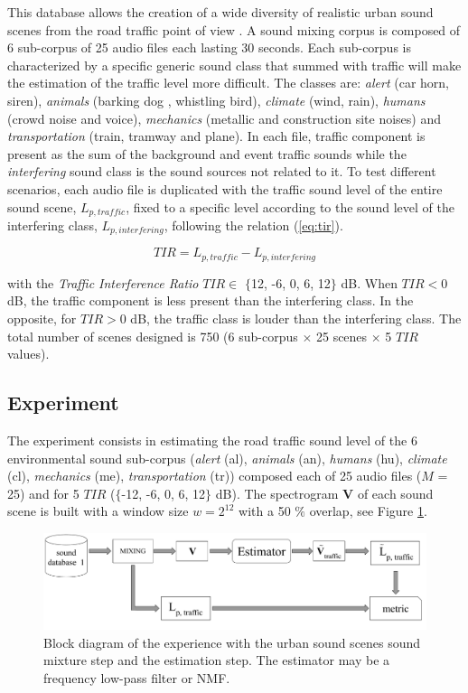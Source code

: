 \documentclass[twocolumn]{svjour3}          %
\begin{document}
This database allows the creation of a wide diversity of realistic urban sound scenes from the road traffic point of view \cite{gloaguen_creation_2017}. A sound mixing corpus is composed of 6 sub-corpus of 25 audio files each lasting 30 seconds. Each sub-corpus is characterized by a specific generic sound class that summed with traffic will make the estimation of the traffic level more difficult. The classes are: \textit{alert} (car horn, siren), \textit{animals} (barking dog , whistling bird), \textit{climate} (wind, rain), \textit{humans} (crowd noise and voice), \textit{mechanics} (metallic and construction site noises) and \textit{transportation} (train, tramway and plane). In each file, traffic component is present as the sum of the background and event traffic sounds while the \textit{interfering} sound class is the sound sources not related to it. To test different scenarios, each audio file is duplicated with the traffic sound level of the entire sound scene, $L_{p,traffic}$, fixed to a specific level according to the sound level of the interfering class, $L_{p,interfering}$,  following the relation (\ref{eq:tir}).

\begin{equation}\label{eq:tir}
TIR = L_{p,traffic}-L_{p,interfering}
\end{equation}

with the \textit{Traffic Interference Ratio} $TIR \in$ $\lbrace$12, -6, 0, 6, 12$\rbrace$ dB. When $TIR < 0$ dB, the traffic component is less present than the interfering class. In the opposite, for $TIR > 0$ dB, the traffic class is louder than the interfering class. The total number of scenes designed is 750 (6 sub-corpus $\times$ 25 scenes $\times$  5 $TIR$ values).

\subsection{Experiment}

The experiment consists in estimating the road traffic sound level of the 6 environmental sound sub-corpus (\textit{alert} (al), \textit{animals} (an), \textit{humans} (hu), \textit{climate} (cl), \textit{mechanics} (me), \textit{transportation} (tr)) composed each of 25 audio files ($M$ = 25) and for 5 $TIR$ ($\lbrace$-12, -6, 0, 6, 12$\rbrace$ dB). The spectrogram $\mathbf{V}$ of each sound scene is built with a window size $w = 2^{12}$ with a 50 $\%$ overlap, see Figure \ref{fig:bloc_experiment}.

\begin{figure}
    \centering
    \includegraphics[width=\linewidth]{figures/bloc_diagram_estimator.pdf}
    \caption{Block diagram of the experience with the urban sound scenes sound mixture step and the estimation step. The estimator may be a frequency low-pass filter or NMF.}
    \label{fig:bloc_experiment}
\end{figure}
\end{document}
